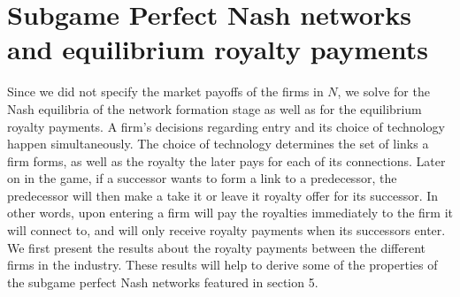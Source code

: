\documentclass{article}
\begin{document}
\section{Subgame Perfect Nash networks and equilibrium royalty payments}
Since we did not specify the market payoffs of the firms in $N$, we solve for the Nash equilibria of the network formation stage as well as for the equilibrium royalty payments. A firm's decisions regarding entry and its choice of technology happen simultaneously. The choice of technology determines the set of links a firm forms, as well as the royalty the later pays for each of its connections. Later on in the game, if a successor wants to form a link to a predecessor, the predecessor will then make a take it or leave it royalty offer for its successor. In other words, upon entering a firm will pay the royalties immediately to the firm it will connect to, and will only receive royalty payments when its successors enter.  \\ 
\indent We first present the results about the royalty payments between the different firms in the industry. These results will help to derive some of the properties of the subgame perfect Nash networks featured in section 5. 
\end{document}

